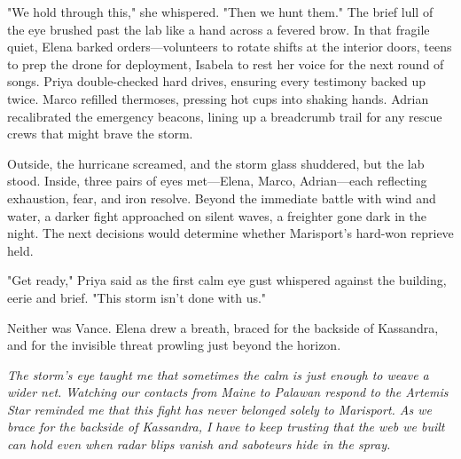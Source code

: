 "We hold through this," she whispered. "Then we hunt them." The brief lull of the eye brushed past the lab like a hand across a fevered brow. In that fragile quiet, Elena barked orders—volunteers to rotate shifts at the interior doors, teens to prep the drone for deployment, Isabela to rest her voice for the next round of songs. Priya double-checked hard drives, ensuring every testimony backed up twice. Marco refilled thermoses, pressing hot cups into shaking hands. Adrian recalibrated the emergency beacons, lining up a breadcrumb trail for any rescue crews that might brave the storm.

Outside, the hurricane screamed, and the storm glass shuddered, but the lab stood. Inside, three pairs of eyes met—Elena, Marco, Adrian—each reflecting exhaustion, fear, and iron resolve. Beyond the immediate battle with wind and water, a darker fight approached on silent waves, a freighter gone dark in the night. The next decisions would determine whether Marisport's hard-won reprieve held.

"Get ready," Priya said as the first calm eye gust whispered against the building, eerie and brief. "This storm isn't done with us."

Neither was Vance. Elena drew a breath, braced for the backside of Kassandra, and for the invisible threat prowling just beyond the horizon.

\noindent\textit{The storm's eye taught me that sometimes the calm is just enough to weave a wider net. Watching our contacts from Maine to Palawan respond to the \textit{Artemis Star} reminded me that this fight has never belonged solely to Marisport. As we brace for the backside of Kassandra, I have to keep trusting that the web we built can hold even when radar blips vanish and saboteurs hide in the spray.}
